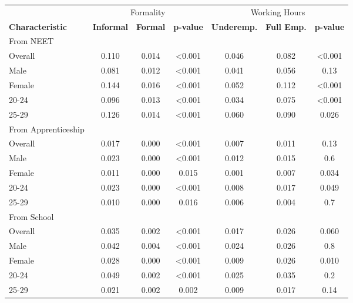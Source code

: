 \begin{longtable}{lcccccc}
\toprule
 & \multicolumn{3}{c}{Formality} & \multicolumn{3}{c}{Working Hours} \\ 
 \cmidrule(lr){2-4} \cmidrule(lr){5-7}
\textbf{Characteristic} & \textbf{Informal} & \textbf{Formal} & \textbf{p-value} & \textbf{Underemp.} & \textbf{Full Emp.} & \textbf{p-value} \\ 
\midrule
\midrule
From NEET &&&&& \\
Overall & 0.110 & 0.014 & <0.001 & 0.046 & 0.082 & <0.001 \\ 
Male & 0.081 & 0.012 & <0.001 & 0.041 & 0.056 & 0.13 \\ 
Female & 0.144 & 0.016 & <0.001 & 0.052 & 0.112 & <0.001 \\ 
20-24 & 0.096 & 0.013 & <0.001 & 0.034 & 0.075 & <0.001 \\ 
25-29 & 0.126 & 0.014 & <0.001 & 0.060 & 0.090 & 0.026 \\ 
\midrule
From Apprenticeship &&&&& \\
Overall & 0.017 & 0.000 & <0.001 & 0.007 & 0.011 & 0.13 \\ 
Male & 0.023 & 0.000 & <0.001 & 0.012 & 0.015 & 0.6 \\ 
Female & 0.011 & 0.000 & 0.015 & 0.001 & 0.007 & 0.034 \\ 
20-24 & 0.023 & 0.000 & <0.001 & 0.008 & 0.017 & 0.049 \\ 
25-29 & 0.010 & 0.000 & 0.016 & 0.006 & 0.004 & 0.7 \\ 
\midrule
From School &&&&& \\
Overall & 0.035 & 0.002 & <0.001 & 0.017 & 0.026 & 0.060 \\ 
Male & 0.042 & 0.004 & <0.001 & 0.024 & 0.026 & 0.8 \\ 
Female & 0.028 & 0.000 & <0.001 & 0.009 & 0.026 & 0.010 \\ 
20-24 & 0.049 & 0.002 & <0.001 & 0.025 & 0.035 & 0.2 \\ 
25-29 & 0.021 & 0.002 & 0.002 & 0.009 & 0.017 & 0.14 \\ 
 \bottomrule
\end{longtable}